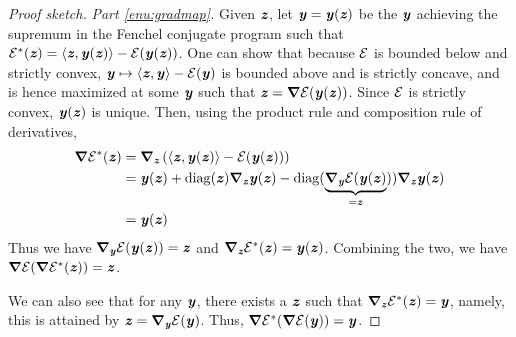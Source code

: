\begin{proof}[Proof sketch]
 \emph{Part \ref{enu:gradmap}.} Given $\zz$, let $\yy=\yy(\zz)$
  be the $\yy$ achieving the supremum in the Fenchel conjugate program
  such that
  $\calE^*(\zz) = \ip{\zz, \yy(\zz)} - \calE(\yy(\zz))$.
  One can show that because $\calE$ is bounded below and strictly
  convex,  $\yy \mapsto \ip{\zz, \yy} - \calE(\yy) $ is bounded above
  and is strictly concave, and is hence maximized at some $\yy$ such that $\zz = \grad\calE(\yy(\zz))$.
  Since $\calE$ is strictly convex, $\yy(\zz)$ is unique. Then, using the product rule and composition rule of derivatives,
  \begin{align*}
    \grad\calE^*(\zz) &= \grad_{\zz} \left(\langle\zz,\yy(\zz)\rangle - \calE(\yy(\zz))\right) \\
    &= \yy(\zz) + \diag(\zz)\grad_{\zz}\yy(\zz) - \diag(\underbrace{\grad_{\yy}\calE(\yy(\zz)}_{=\zz}))\grad_{\zz}\yy(\zz) \\
    &= \yy(\zz)
  \end{align*}
  Thus we have $\grad_{\yy}\calE(\yy(\zz)) = \zz$ and
  $\grad_{\zz}\calE^*(\zz)=\yy(\zz)$.
  Combining the two, we have $\grad\calE(\grad\calE^*(\zz))=\zz$.


We can also see that for any $\yy$, there exists a $\zz$ such that
$\grad_{\zz}\calE^*(\zz)=\yy$, namely, this is attained by $\zz =
\grad_{\yy}\calE(\yy)$.
Thus, $\grad\calE^*(\grad\calE(\yy))=\yy$.













\end{proof}
